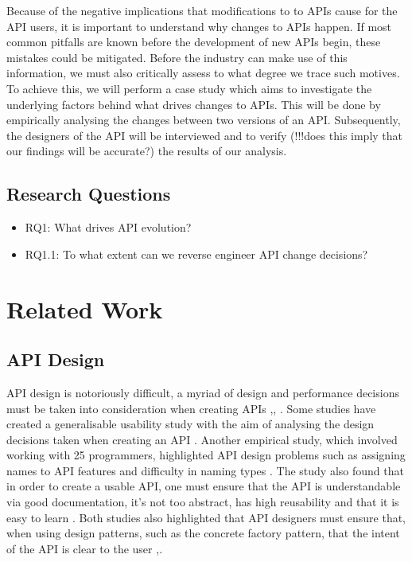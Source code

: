 \documentclass[10pt,twocolumn]{article}
\begin{document}
Because of the negative implications that modifications to to APIs cause for the API users, it is important to understand why changes to APIs happen. If most common pitfalls are known before the development of new APIs begin, these mistakes could be mitigated. Before the industry can make use of this information, we must also critically assess to what degree we trace such motives. To achieve this, we will perform a case study which aims to investigate the underlying factors behind what drives changes to APIs. This will be done by empirically analysing the changes between two versions of an API. Subsequently, the designers of the API will be interviewed and to verify (!!!does this imply that our findings will be accurate?) the results of our analysis. 

\subsection{Research Questions}
\begin{itemize}
\item RQ1: What drives API evolution? 
\item RQ1.1: To what extent can we reverse engineer API change decisions?
\end{itemize}


\section{Related Work}

\subsection{API Design}

API design is notoriously difficult, a myriad of design and performance decisions must be taken into consideration when creating APIs \cite{bloch2008effective},\cite{afonso2012evaluating}, \cite{stylos2006comparing}. Some studies have created a generalisable usability study with the aim of analysing the design decisions taken when creating an API \cite{}. Another empirical study, which involved working with 25 programmers, highlighted API design problems such as assigning names to API features and difficulty in naming types \cite{shi2011empirical}. The study also found that in order to create a usable API, one must ensure that the API is understandable via good documentation, it’s not too abstract, has high reusability and that it is easy to learn \cite{shi2011empirical}. Both studies also highlighted that API designers must ensure that, when using design patterns, such as the concrete factory pattern, that the intent of the API is clear to the user \cite{shi2011empirical},\cite{stylos2006comparing}.
\end{document}
